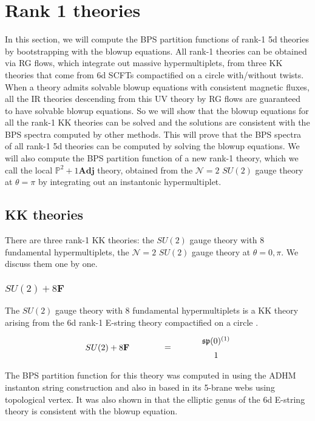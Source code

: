 \section{Rank 1 theories}\label{sec:rank1theories}

In this section, we will compute the BPS partition functions of rank-1 5d theories by bootstrapping with the blowup equations. All rank-1 theories can be obtained via RG flows, which integrate out massive hypermultiplets, from three KK theories that come from 6d SCFTs compactified on a circle with/without twists. When a theory admits solvable blowup equations with consistent magnetic fluxes, all the IR theories descending from this UV theory by RG flows are guaranteed to have solvable blowup equations. So we will show that the blowup equations for all the rank-1 KK theories can be solved and the solutions are consistent with the BPS spectra computed by other methods. This will prove that the BPS spectra of all rank-1 5d theories can be computed by solving the blowup equations. We will also compute the BPS partition function of a new rank-1 theory, which we call the local $\mathbb{P}^2+1\mathbf{Adj}$ theory, obtained from the $\mathcal{N}=2$ $SU(2)$ gauge theory at $\theta=\pi$ by integrating out an instantonic hypermultiplet.


\subsection{KK theories}
There are three rank-1 KK theories: the $SU(2)$ gauge theory with 8 fundamental hypermultiplets, the $\mathcal{N}=2$ $SU(2)$ gauge theory at $\theta=0,\pi$. We discuss them one by one. 

\subsubsection{\texorpdfstring{$SU(2)+8\mathbf{F}$}{SU(2) + 8F}}

The $SU(2)$ gauge theory with 8 fundamental hypermultiplets is a KK theory arising from the 6d rank-1 E-string theory compactified on a circle \cite{Witten:1995gx,Ganor:1996mu,Seiberg:1996bd}.
\begin{align}
\begin{tikzpicture}
\draw (0, 0) node {$ SU(2) + 8\mathbf{F} $}
(2.5, 0) node {$ = $}
(4.5, 0.3) node {$ \mathfrak{sp}(0)^{(1)} $}
(4.5, -0.3) node {$ 1 $};
\end{tikzpicture}
\end{align}
The BPS partition function for this theory was computed in \cite{Hwang:2014uwa,Kim:2014dza} using the ADHM instanton string construction and also in \cite{Kim:2015jba,Kim:2017jqn} based in its 5-brane webs using topological vertex. It was also shown in \cite{Gu:2019pqj} that the elliptic genus of the 6d E-string theory is consistent with the blowup equation. 

